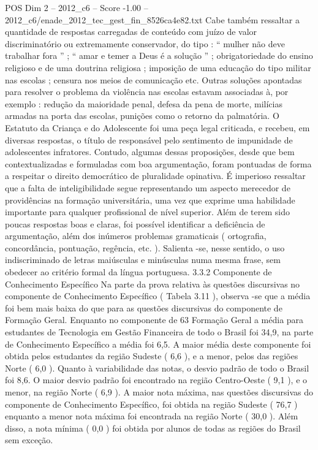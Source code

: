 \begin{textsample}{POS Dim 2 – 2012\_c6 – Score -1.00 – 2012\_c6/enade\_2012\_tec\_gest\_fin\_8526ca4e82.txt}
Cabe também ressaltar a quantidade de respostas carregadas de conteúdo com juízo de valor discriminatório ou extremamente conservador, do tipo : “ mulher não deve trabalhar fora ” ; “ amar e temer a Deus é a solução ” ; obrigatoriedade do ensino religioso e de uma doutrina religiosa ; imposição de uma educação do tipo militar nas escolas ; censura nos meios de comunicação etc.
Outras soluções apontadas para resolver o problema da violência nas escolas estavam associadas à, por exemplo : redução da maioridade penal, defesa da pena de morte, milícias armadas na porta das escolas, punições como o retorno da palmatória.
O Estatuto da Criança e do Adolescente foi uma peça legal criticada, e recebeu, em diversas respostas, o título de responsável pelo sentimento de impunidade de adolescentes infratores.
Contudo, algumas dessas proposições, desde que bem contextualizadas e formuladas com boa argumentação, foram pontuadas de forma a respeitar o direito democrático de pluralidade opinativa.
É imperioso ressaltar que a falta de inteligibilidade segue representando um aspecto merecedor de providências na formação universitária, uma vez que exprime uma habilidade importante para qualquer profissional de nível superior.
Além de terem sido poucas respostas boas e claras, foi possível identificar a deficiência de argumentação, além dos inúmeros problemas gramaticais ( ortografia, concordância, pontuação, regência, etc. ).
Salienta -se, nesse sentido, o uso indiscriminado de letras maiúsculas e minúsculas numa mesma frase, sem obedecer ao critério formal da língua portuguesa. 3.3.2 Componente de Conhecimento Específico Na parte da prova relativa às questões discursivas no componente de Conhecimento Específico ( Tabela 3.11 ), observa -se que a média foi bem mais baixa do que para as questões discursivas do componente de Formação Geral.
Enquanto no componente de 63 Formação Geral a média para estudantes de Tecnologia em Gestão Financeira de todo o Brasil foi 34,9, na parte de Conhecimento Específico a média foi 6,5.
A maior média deste componente foi obtida pelos estudantes da região Sudeste ( 6,6 ), e a menor, pelos das regiões Norte ( 6,0 ).
Quanto à variabilidade das notas, o desvio padrão de todo o Brasil foi 8,6.
O maior desvio padrão foi encontrado na região Centro-Oeste ( 9,1 ), e o menor, na região Norte ( 6,9 ).
A maior nota máxima, nas questões discursivas do componente de Conhecimento Específico, foi obtida na região Sudeste ( 76,7 ) enquanto a menor nota máxima foi encontrada na região Norte ( 30,0 ).
Além disso, a nota mínima ( 0,0 ) foi obtida por alunos de todas as regiões do Brasil sem exceção.

\end{textsample}
